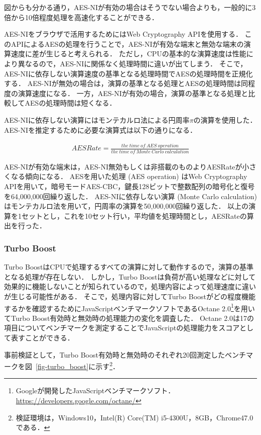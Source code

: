 図からも分かる通り，AES-NIが有効の場合はそうでない場合よりも，一般的に3倍から10倍程度処理を高速化することができる．

AES-NIをブラウザで活用するためにはWeb Cryptography APIを使用する．
このAPIによるAESの処理を行うことで，AES-NIが有効な端末と無効な端末の演算速度に差が生じると考えられる．
ただし，CPUの基本的な演算速度は性能により異なるので，AES-NIに関係なく処理時間に違いが出てしまう．
そこで，AES-NIに依存しない演算速度の基準となる処理時間でAESの処理時間を正規化する．
AES-NIが無効の場合は，演算の基準となる処理とAESの処理時間は同程度の演算速度になる．
一方，AES-NIが有効の場合，演算の基準となる処理と比較してAESの処理時間は短くなる．

AES-NIに依存しない演算にはモンテカルロ法による円周率$\pi$の演算を使用した．
AES-NIを推定するために必要な演算式は以下の通りになる．

\begin{eqnarray*}
  AESRate = \frac{the\ time\ of\ AES\ operation}{the\ time\ of\ Monte\ Carlo\ calculation}
\end{eqnarray*}

AES-NIが有効な端末は，AES-NI無効もしくは非搭載のものよりAESRateが小さくなる傾向になる．
AESを用いた処理 (AES operation) はWeb Cryptography APIを用いて，暗号モードAES-CBC，鍵長128ビットで整数配列の暗号化と復号を64,000,000回繰り返した．
AES-NIに依存しない演算 (Monte Carlo calculation) はモンテカルロ法を用いて，円周率の演算を50,000,000回繰り返した．
以上の演算を1セットとし，これを10セット行い，平均値を処理時間とし，AESRateの算出を行った．

\subsubsection{Turbo Boost}
Turbo BoostはCPUで処理するすべての演算に対して動作するので，演算の基準となる処理が存在しない．
しかし，Turbo Boostは負荷が高い処理などに対して効果的に機能しないことが知られているので，処理内容によって処理速度に違いが生じる可能性がある．
そこで，処理内容に対してTurbo Boostがどの程度機能するかを確認するためにJavaScriptベンチマークソフトであるOctane 2.0\footnote{Googleが開発したJavaScriptベンチマークソフト．\url{https://developers.google.com/octane/}}を用いてTurbo Boost有効時と無効時の処理能力の変化を調査した．
Octane 2.0は17の項目についてベンチマークを測定することでJavaScriptの処理能力をスコアとして表すことができる．

事前検証として，Turbo Boost有効時と無効時のそれぞれ20回測定したベンチマークを図~\ref{fig-turbo_boost}に示す\footnote{検証環境は，Windows10，Intel(R) Core(TM) i5-4300U，8GB，Chrome47.0である．}．

